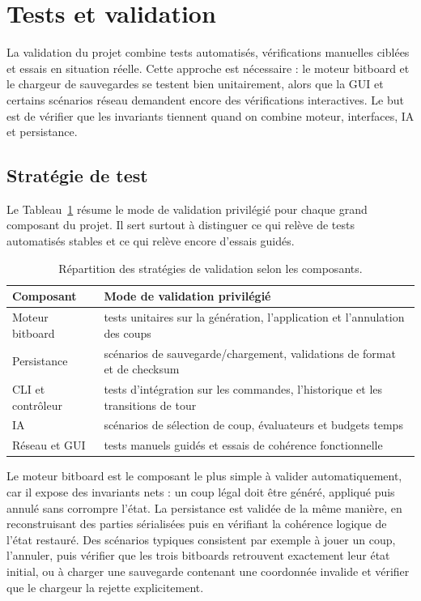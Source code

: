 \documentclass[a4paper]{article}
\providecommand{\toprule}{\hline}
\providecommand{\midrule}{\hline}
\providecommand{\bottomrule}{\hline}
\begin{document}
\section{Tests et validation}

La validation du projet combine tests automatisés, vérifications manuelles ciblées et essais en situation réelle. Cette approche est nécessaire : le moteur bitboard et le chargeur de sauvegardes se testent bien unitairement, alors que la GUI et certains scénarios réseau demandent encore des vérifications interactives. Le but est de vérifier que les invariants tiennent quand on combine moteur, interfaces, IA et persistance.

\subsection{Stratégie de test}

Le Tableau~\ref{tab:test-strategy} résume le mode de validation privilégié pour chaque grand composant du projet. Il sert surtout à distinguer ce qui relève de tests automatisés stables et ce qui relève encore d'essais guidés.

\begin{table}[H]
\centering
\begin{tabular}{lp{9cm}}
\toprule
\textbf{Composant} & \textbf{Mode de validation privilégié} \\
\midrule
Moteur bitboard & tests unitaires sur la génération, l'application et l'annulation des coups \\
Persistance & scénarios de sauvegarde/chargement, validations de format et de checksum \\
CLI et contrôleur & tests d'intégration sur les commandes, l'historique et les transitions de tour \\
IA & scénarios de sélection de coup, évaluateurs et budgets temps \\
Réseau et GUI & tests manuels guidés et essais de cohérence fonctionnelle \\
\bottomrule
\end{tabular}
\caption{Répartition des stratégies de validation selon les composants.}
\label{tab:test-strategy}
\end{table}

Le moteur bitboard est le composant le plus simple à valider automatiquement, car il expose des invariants nets : un coup légal doit être généré, appliqué puis annulé sans corrompre l'état. La persistance est validée de la même manière, en reconstruisant des parties sérialisées puis en vérifiant la cohérence logique de l'état restauré. Des scénarios typiques consistent par exemple à jouer un coup, l'annuler, puis vérifier que les trois bitboards retrouvent exactement leur état initial, ou à charger une sauvegarde contenant une coordonnée invalide et vérifier que le chargeur la rejette explicitement.
\end{document}
